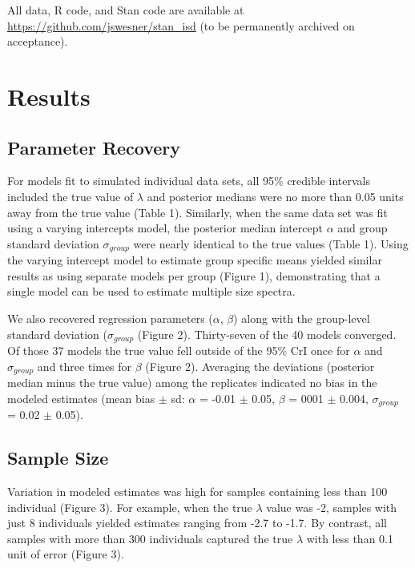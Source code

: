 \documentclass[
  12pt,
]{article}
\numberwithin{equation}
\begin{document}
All data, R code, and Stan code are available at
\url{https://github.com/jswesner/stan_isd} (to be permanently archived
on acceptance).

\hypertarget{results}{%
\section{Results}\label{results}}

\hypertarget{parameter-recovery}{%
\subsection{Parameter Recovery}\label{parameter-recovery}}

For models fit to simulated individual data sets, all 95\% credible
intervals included the true value of \(\lambda\) and posterior medians
were no more than 0.05 units away from the true value (Table 1).
Similarly, when the same data set was fit using a varying intercepts
model, the posterior median intercept \(\alpha\) and group standard
deviation \(\sigma_{group}\) were nearly identical to the true values
(Table 1). Using the varying intercept model to estimate group specific
means yielded similar results as using separate models per group (Figure
1), demonstrating that a single model can be used to estimate multiple
size spectra.

We also recovered regression parameters (\(\alpha\), \(\beta\)) along
with the group-level standard deviation (\(\sigma_{group}\) (Figure 2).
Thirty-seven of the 40 models converged. Of those 37 models the true
value fell outside of the 95\% CrI once for \(\alpha\) and
\(\sigma_{group}\) and three times for \(\beta\) (Figure 2). Averaging
the deviations (posterior median minus the true value) among the
replicates indicated no bias in the modeled estimates (mean bias \(\pm\)
sd: \(\alpha\) = -0.01 \(\pm\) 0.05, \(\beta\) = 0001 \(\pm\) 0.004,
\(\sigma_{group}\) = 0.02 \(\pm\) 0.05).

\hypertarget{sample-size-1}{%
\subsection{Sample Size}\label{sample-size-1}}

Variation in modeled estimates was high for samples containing less than
100 individual (Figure 3). For example, when the true \(\lambda\) value
was -2, samples with just 8 individuals yielded estimates ranging from
-2.7 to -1.7. By contrast, all samples with more than 300 individuals
captured the true \(\lambda\) with less than 0.1 unit of error (Figure
3).
\end{document}
